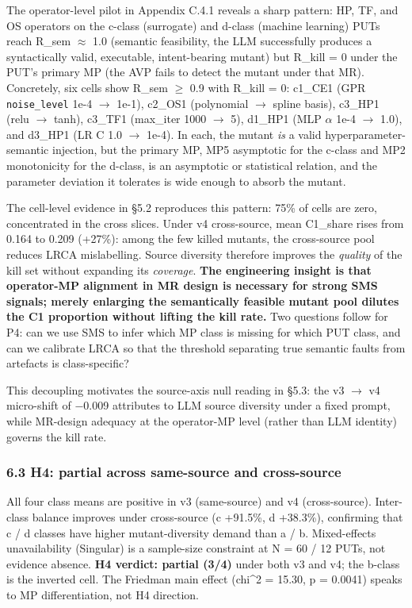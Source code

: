 \documentclass[review,12pt,authoryear]{elsarticle}
\begin{document}
The operator-level pilot in Appendix C.4.1 reveals a sharp pattern: HP,
TF, and OS operators on the c-class (surrogate) and d-class (machine
learning) PUTs reach R\_sem $\approx$ 1.0 (semantic feasibility, the LLM
successfully produces a syntactically valid, executable, intent-bearing
mutant) but R\_kill = 0 under the PUT's primary MP (the AVP fails to
detect the mutant under that MR). Concretely, six cells show R\_sem $\geq$
0.9 with R\_kill = 0: c1\_CE1 (GPR \texttt{noise\_level} 1e-4 $\to$ 1e-1),
c2\_OS1 (polynomial $\to$ spline basis), c3\_HP1 (relu $\to$ tanh), c3\_TF1
(max\_iter 1000 $\to$ 5), d1\_HP1 (MLP $\alpha$ 1e-4 $\to$ 1.0), and d3\_HP1 (LR C 1.0
$\to$ 1e-4). In each, the mutant \emph{is} a valid hyperparameter-semantic
injection, but the primary MP, MP5 asymptotic for the c-class and MP2
monotonicity for the d-class, is an asymptotic or statistical relation,
and the parameter deviation it tolerates is wide enough to absorb the
mutant.

The cell-level evidence in §5.2 reproduces this pattern: 75\% of cells
are zero, concentrated in the cross slices. Under v4 cross-source, mean
C1\_share rises from 0.164 to 0.209 (+27\%): among the few killed
mutants, the cross-source pool reduces LRCA mislabelling. Source
diversity therefore improves the \emph{quality} of the kill set without
expanding its \emph{coverage}. \textbf{The engineering insight is that
operator-MP alignment in MR design is necessary for strong SMS signals;
merely enlarging the semantically feasible mutant pool dilutes the C1
proportion without lifting the kill rate.} Two questions follow for P4:
can we use SMS to infer which MP class is missing for which PUT class,
and can we calibrate LRCA so that the threshold separating true semantic
faults from artefacts is class-specific?

This decoupling motivates the source-axis null reading in §5.3: the v3 $\to$
v4 micro-shift of −0.009 attributes to LLM source diversity under a
fixed prompt, while MR-design adequacy at the operator-MP level (rather
than LLM identity) governs the kill rate.

\subsubsection{6.3 H4: partial across same-source and
cross-source}\label{h4-partial-across-same-source-and-cross-source}

All four class means are positive in v3 (same-source) and v4
(cross-source). Inter-class balance improves under cross-source (c
+91.5\%, d +38.3\%), confirming that c / d classes have higher
mutant-diversity demand than a / b. Mixed-effects unavailability
(Singular) is a sample-size constraint at N = 60 / 12 PUTs, not evidence
absence. \textbf{H4 verdict: partial (3/4)} under both v3 and v4; the
b-class is the inverted cell. The Friedman main effect (chi\^{}2 =
15.30, p = 0.0041) speaks to MP differentiation, not H4 direction.
\end{document}
